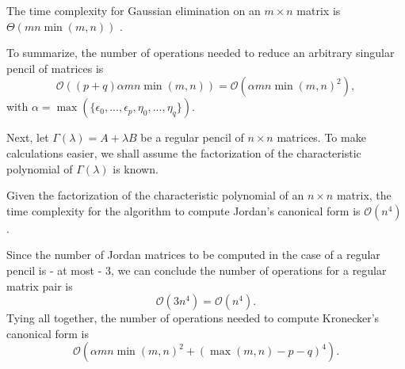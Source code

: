 \begin{remark}
    The time complexity for Gaussian elimination on an \(m \times n\) matrix is
    \(\Theta(mn \min(m, n))\) \cite{boyd_vandenberghe_2018}.
\end{remark}

To summarize, the number of operations needed to reduce an arbitrary singular pencil of matrices is
\[
    \mathcal{O}((p + q)\alpha mn \min(m, n)) = \mathcal{O}(\alpha mn \min(m, n)^2),
\]
with \(\alpha = \max(\{\epsilon_0, ..., \epsilon_p, \eta_0, ..., \eta_q\})\).

Next, let \(\Gamma(\lambda) = A + \lambda B\) be a regular pencil of \(n \times n\) matrices. To make calculations
easier, we shall assume the factorization of the characteristic polynomial of \(\Gamma(\lambda)\) is known.

\begin{remark}
    Given the factorization of the characteristic polynomial of an \(n \times n\) matrix, the time complexity
    for the algorithm to compute Jordan's canonical form is \(\mathcal{O}(n^4)\)
    \cite{DBLP:journals/corr/abs-cs-0412005}.
\end{remark}

Since the number of Jordan matrices to be computed in the case of a regular pencil is - at most - 3, we can conclude
the number of operations for a regular matrix pair is
\[
    \mathcal{O}(3n^4) = \mathcal{O}(n^4).
\]
Tying all together, the number of operations needed to compute Kronecker's canonical form is
\[
    \mathcal{O}(\alpha mn \min(m, n)^2 + (\max(m, n) - p - q)^4).
\]